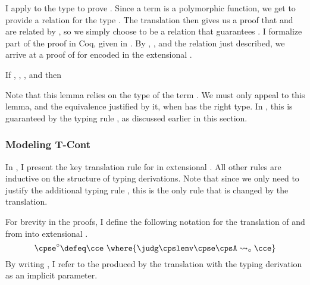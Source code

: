 I apply  to the  type
\im{\ccpity{\ccalpha}{\ccstarty}{\ccfunty{(\ccfunty{\ccB}{\ccalpha})}{\ccalpha}}}
to prove .
Since a  term is a polymorphic function, we get to provide a
relation  for the type \im{\ccalpha}.
The translation then gives us a proof that \im{{\ccappe{\cce}{\ccA~\cck}}} and
\im{{\ccappe{\cce}{\ccB~\ccidk}}} are related by ,
so we simply choose  to be a relation that guarantees
\im{\ccappe{\cce}{\ccA~\cck} = \ccappe{\cck}{(\ccappe{\cce}{\ccB~\ccidk})}}.
I formalize part of the proof in Coq, given in .
By , , and the
relation just described, we arrive at a proof of
 for   encoded in
the extensional .
\begin{lemma}
  \label{lem:cps:cont-shuffle}
  If \im{\cctyjudg{\cclenv}{\ccA}{\ccstarty}},
  \im{\cctyjudg{\cclenv}{\ccB}{\ccstarty}},
  \im{\cctyjudg{\cclenv}{\cck}{\ccfunty{\ccB}{\ccA}}}, and
  \im{\cctyjudg{\cclenv}{\cce}{\ccpity{\ccalpha}{\ccstarty}{\ccfunty{(\ccfunty{\ccB}{\ccalpha})}{\ccalpha}}}}
  then
  \im{\ccequivjudg{\cclenv}{\ccappe{\cce}{\ccA~\cck}}{\ccappe{\cck}{(\ccappe{\cce}{\ccB~\ccidk})}}}
\end{lemma}

Note that this lemma relies on the type of the term \im{\cce}.
We must only appeal to this lemma, and the equivalence justified by it, when
\im{\cce} has the right type.
In \cpstlang, this is guaranteed by the typing rule , as
discussed earlier in this section.

\subsubsection{Modeling {T-Cont}}
\FigANF

In , I present the key translation rule for
 \cpstlang in extensional .
All other rules are inductive on the structure of typing derivations.
Note that since we only need to justify the additional typing rule
, this is the only rule that is changed by the translation.

For brevity in the proofs, I define the following notation for the translation
of  and from \cpstlang into extensional .
\begin{displaymath}
  \cpsmodel{\cpse} \defeq \cce~\where{\anfjudg{\cpslenv}{\cpse}{\cpsA}{\cce}}
\end{displaymath}
By writing \im{\cpsmodel{\cpse}}, I refer to the  produced by the
translation with the typing derivation \im{\cpstyjudg{\cpslenv}{\cpse}{\cpsA}}
as an implicit parameter.


